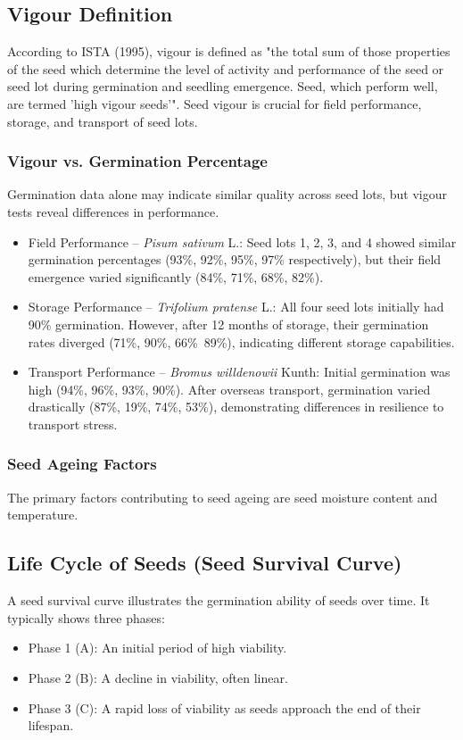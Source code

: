 \subsection{Vigour Definition} 
According to ISTA (1995), vigour is defined as "the total sum of those properties of the seed which determine the level of activity and performance of the seed or seed lot during germination and seedling emergence. Seed, which perform well, are termed ’high vigour seeds’". Seed vigour is crucial for field performance, storage, and transport of seed lots.

\subsubsection{Vigour vs. Germination Percentage} 
Germination data alone may indicate similar quality across seed lots, but vigour tests reveal differences in performance. 

\begin{itemize} 
    \item Field Performance – \textit{Pisum sativum} L.: Seed lots 1, 2, 3, and 4 showed similar germination percentages (93\%, 92\%, 95\%, 97\% respectively), but their field emergence varied significantly (84\%, 71\%, 68\%, 82\%). 
    \item Storage Performance – \textit{Trifolium pratense} L.: All four seed lots initially had 90\% germination. However, after 12 months of storage, their germination rates diverged (71\%, 90\%, 66\%\, 89\%), indicating different storage capabilities. 
    \item Transport Performance – \textit{Bromus willdenowii} Kunth: Initial germination was high (94\%, 96\%, 93\%, 90\%). After overseas transport, germination varied drastically (87\%, 19\%, 74\%, 53\%), demonstrating differences in resilience to transport stress. 
\end{itemize}

\subsubsection{Seed Ageing Factors} 
The primary factors contributing to seed ageing are seed moisture content and temperature.

\subsection{Life Cycle of Seeds (Seed Survival Curve)} 
A seed survival curve illustrates the germination ability of seeds over time. It typically shows three phases: 
\begin{itemize} 
    \item Phase 1 (A): An initial period of high viability. 
    \item Phase 2 (B): A decline in viability, often linear. 
    \item Phase 3 (C): A rapid loss of viability as seeds approach the end of their lifespan. 
\end{itemize} 


